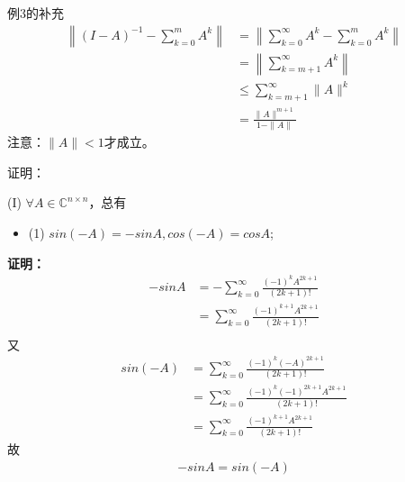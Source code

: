 \documentclass{article}
\begin{document}
\begin{zremark}
  例3的补充
  \begin{align*}
    \left\| (I - A)^{-1} - \sum\limits_{k=0}^m A^k \right\|
     & = \left\| \sum\limits_{k=0}^\infty A^k - \sum\limits_{k=0}^m A^k \right\| \\
     & = \left\| \sum\limits_{k=m + 1}^\infty A^k\right\|                        \\
     & \leq \sum\limits_{k=m + 1}^\infty \| A \|^k                               \\
     & = \frac{\|A\|^{m + 1}}{1 - \|A\|}
  \end{align*}
  注意：$\|A\| < 1$才成立。
\end{zremark}

\begin{zremark}
  证明：

  (I) $\forall A \in \mathbb{C}^{n \times n}$，总有
  \begin{itemize}
    \item (1) $sin (-A) = -sin A, cos(-A) = cos A$;
  \end{itemize}
\end{zremark}

\textbf{证明：}
\begin{align*}
  - sin A
   & = - \sum\limits_{k = 0}^\infty \frac{(-1)^k A^{2k + 1}}{(2k + 1)!}   \\
   & = \sum\limits_{k = 0}^\infty \frac{(-1)^{k+1} A^{2k + 1}}{(2k + 1)!} \\
\end{align*}
又
\begin{align*}
  sin (-A)
   & = \sum\limits_{k = 0}^\infty \frac{(-1)^k (-A)^{2k + 1}}{(2k + 1)!}           \\
   & = \sum\limits_{k = 0}^\infty \frac{(-1)^k (-1)^{2k + 1}A^{2k + 1}}{(2k + 1)!} \\
   & = \sum\limits_{k = 0}^\infty \frac{(-1)^{k + 1}A^{2k + 1}}{(2k + 1)!}         
\end{align*}
故
\begin{align*}
  -sin A = sin (-A)
\end{align*}
\end{document}
